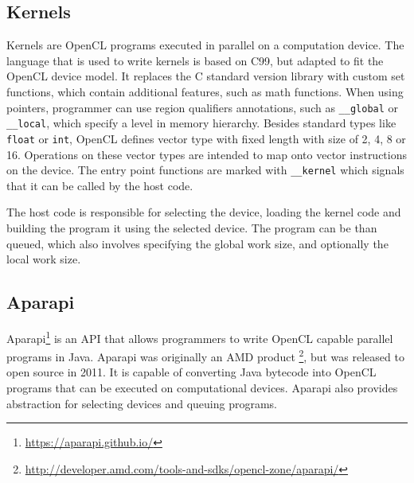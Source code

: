 \documentclass{l4proj}
\begin{document}
\subsection{Kernels}

Kernels are OpenCL programs executed in parallel on a computation device. The language that is
used to write kernels is based on C99, but adapted to fit the OpenCL device model. It replaces 
the C standard version library with custom set functions, which contain additional features, such as 
math functions. When using pointers, programmer can use region qualifiers annotations, such as
\texttt{\_\_global} or \texttt{\_\_local}, which specify a level in memory hierarchy. Besides standard
types like \texttt{float} or \texttt{int}, OpenCL defines vector type with fixed length with size
of 2, 4, 8 or 16. Operations on these vector types are intended to map onto vector instructions on the device.
The entry point functions are marked with \texttt{\_\_kernel} which signals that it can be called by the host code.

The host code is responsible for selecting the device, loading the kernel code and building the 
program it using the selected device. The program can be than queued, which also involves specifying
the global work size, and optionally the local work size.

\subsection{Aparapi}

Aparapi\footnote{\url{https://aparapi.github.io/}} is an API that allows programmers
to write OpenCL capable parallel programs in Java. Aparapi was originally an AMD 
product \footnote{\url{http://developer.amd.com/tools-and-sdks/opencl-zone/aparapi/}},
but was released to open source in 2011. It is capable of converting Java bytecode
into OpenCL programs that can be executed on computational devices. Aparapi also 
provides abstraction for selecting devices and queuing programs. 
\end{document}

